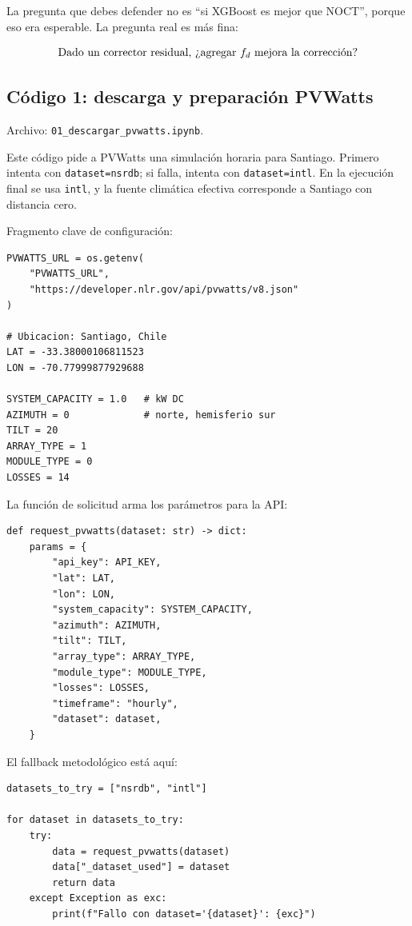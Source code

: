 \documentclass[11pt, letterpaper]{article}
\newcommand{\fd}{f_d}
\begin{document}
La pregunta que debes defender no es ``si XGBoost es mejor que NOCT'', porque eso era esperable. La pregunta real es m\'as fina:

\[
    \text{Dado un corrector residual, \textquestiondown agregar } \fd
    \text{ mejora la correcci\'on?}
\]

\subsection{C\'odigo 1: descarga y preparaci\'on PVWatts}

Archivo: \texttt{01\_descargar\_pvwatts.ipynb}.

Este c\'odigo pide a PVWatts una simulaci\'on horaria para Santiago. Primero intenta con \texttt{dataset=nsrdb}; si falla, intenta con \texttt{dataset=intl}. En la ejecuci\'on final se usa \texttt{intl}, y la fuente clim\'atica efectiva corresponde a Santiago con distancia cero.

Fragmento clave de configuraci\'on:

\begin{lstlisting}[style=pythonstyle]
PVWATTS_URL = os.getenv(
    "PVWATTS_URL",
    "https://developer.nlr.gov/api/pvwatts/v8.json"
)

# Ubicacion: Santiago, Chile
LAT = -33.38000106811523
LON = -70.77999877929688

SYSTEM_CAPACITY = 1.0   # kW DC
AZIMUTH = 0             # norte, hemisferio sur
TILT = 20
ARRAY_TYPE = 1
MODULE_TYPE = 0
LOSSES = 14
\end{lstlisting}

La funci\'on de solicitud arma los par\'ametros para la API:

\begin{lstlisting}[style=pythonstyle]
def request_pvwatts(dataset: str) -> dict:
    params = {
        "api_key": API_KEY,
        "lat": LAT,
        "lon": LON,
        "system_capacity": SYSTEM_CAPACITY,
        "azimuth": AZIMUTH,
        "tilt": TILT,
        "array_type": ARRAY_TYPE,
        "module_type": MODULE_TYPE,
        "losses": LOSSES,
        "timeframe": "hourly",
        "dataset": dataset,
    }
\end{lstlisting}

El fallback metodol\'ogico est\'a aqu\'i:

\begin{lstlisting}[style=pythonstyle]
datasets_to_try = ["nsrdb", "intl"]

for dataset in datasets_to_try:
    try:
        data = request_pvwatts(dataset)
        data["_dataset_used"] = dataset
        return data
    except Exception as exc:
        print(f"Fallo con dataset='{dataset}': {exc}")
\end{lstlisting}
\end{document}
